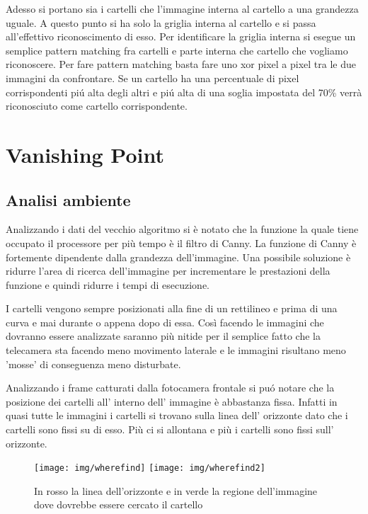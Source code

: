 		Adesso si portano sia i cartelli che l'immagine interna al cartello a una grandezza uguale. A questo punto si ha solo la griglia interna al cartello e si passa all'effettivo riconoscimento di esso. Per identificare la griglia interna si esegue un semplice pattern matching fra cartelli e parte interna che cartello che vogliamo riconoscere. Per fare pattern matching basta fare uno xor pixel a pixel tra le due immagini da confrontare. Se un cartello ha una percentuale di pixel corrispondenti pi\'u alta degli altri e pi\'u alta di una soglia impostata del 70\% verrà riconosciuto come cartello corrispondente.
		

\section{Vanishing Point}

	\subsection{Analisi ambiente}

		Analizzando i dati del vecchio algoritmo si è notato che la funzione la quale tiene occupato il processore per più tempo è il filtro di Canny. La funzione di Canny è fortemente dipendente dalla grandezza dell'immagine. Una possibile soluzione è ridurre l'area di ricerca dell'immagine per incrementare le prestazioni della funzione e quindi ridurre i tempi di esecuzione.

		I cartelli vengono sempre posizionati alla fine di un rettilineo e prima di una curva e mai durante o appena dopo di essa. Così facendo le immagini che dovranno essere analizzate saranno più nitide per il semplice fatto che la telecamera sta facendo meno movimento laterale e le immagini risultano meno 'mosse' di conseguenza meno disturbate.

		Analizzando i frame catturati dalla fotocamera frontale si pu\'o notare che la posizione dei cartelli all' interno dell' immagine è abbastanza fissa. Infatti in quasi tutte le immagini i cartelli si trovano sulla linea dell' orizzonte dato che i cartelli sono fissi su di esso. Più ci si allontana e più i cartelli sono fissi sull' orizzonte.
		\begin{figure}[!ht]
			\centering
			\texttt{[image: img/wherefind]}
			\texttt{[image: img/wherefind2]}
			\caption[Area ricerca cartello]{In rosso la linea dell'orizzonte e in verde la regione dell'immagine dove dovrebbe essere cercato il cartello}
		\end{figure}


